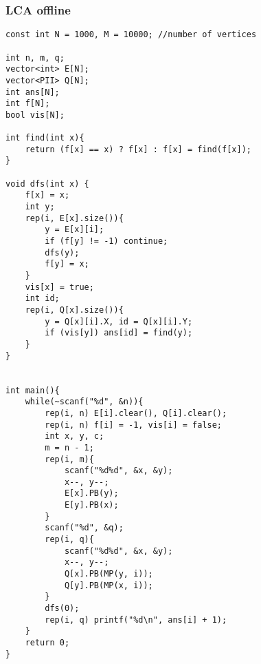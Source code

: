 \subsubsection{LCA offline}
\begin{verbatim}
const int N = 1000, M = 10000; //number of vertices

int n, m, q;
vector<int> E[N];
vector<PII> Q[N];
int ans[N];
int f[N];
bool vis[N];

int find(int x){
    return (f[x] == x) ? f[x] : f[x] = find(f[x]);
}

void dfs(int x) {
    f[x] = x;
    int y;
    rep(i, E[x].size()){
        y = E[x][i];
        if (f[y] != -1) continue;
        dfs(y);
        f[y] = x;
    }
    vis[x] = true;
    int id;
    rep(i, Q[x].size()){
        y = Q[x][i].X, id = Q[x][i].Y;
        if (vis[y]) ans[id] = find(y);
    }
}


int main(){
    while(~scanf("%d", &n)){
        rep(i, n) E[i].clear(), Q[i].clear();
        rep(i, n) f[i] = -1, vis[i] = false;
        int x, y, c;
        m = n - 1;
        rep(i, m){
            scanf("%d%d", &x, &y);
            x--, y--;
            E[x].PB(y);
            E[y].PB(x);
        }
        scanf("%d", &q);
        rep(i, q){
            scanf("%d%d", &x, &y);
            x--, y--;
            Q[x].PB(MP(y, i));
            Q[y].PB(MP(x, i));
        }
        dfs(0);
        rep(i, q) printf("%d\n", ans[i] + 1);
    }
    return 0;
}
\end{verbatim}

